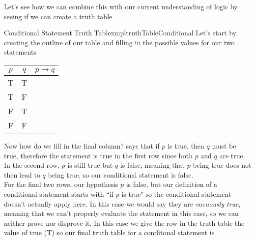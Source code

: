 Let's see how we can combine this with our current understanding of logic by seeing if we can create a truth table

\newpage
\begin{exmpl}[label={exmpl:truthTableConditional}]{Conditional Statement Truth Table}{xmpltruthTableConditional}
    Let's start by creating the outline of our table and filling in the possible values for our two statements
    \begin{center}
        \begin{tabular}{|c|c|c|}
            \hline
            $p$ & $q$ & $p \to q$ \\
            \hline
            T   & T   &           \\
            \hline
            T   & F   &           \\
            \hline
            F   & T   &           \\
            \hline
            F   & F   &           \\
            \hline
        \end{tabular}
    \end{center}
    \vspace{0.5cm}

    Now how do we fill in the final column?  says that if $p$ is true, then $q$ must be true, therefore the statement is true in the first row since both $p$ and $q$ are true.\\

    In the second row, $p$ is still true but $q$ is false, meaning that $p$ being true does not then lead to $q$ being true, so our conditional statement is false.\\

    For the final two rows, our hypothesis $p$ is false, but our definition of a conditional statement starts with ``if $p$ is true" so the conditional statement doesn't actually apply here. In this case we would say they are \emph{vacuously true}, meaning that we can't properly evaluate the statement in this case, so we can neither prove nor disprove it. In this case we give the row in the truth table the value of true (T) so our final truth table for a conditonal statement is


\end{exmpl}
